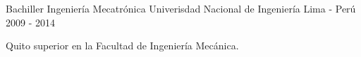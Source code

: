 

\begin{cventries}

  \cventry
    {Bachiller Ingenier\'ia Mecatr\'onica} %
    {Univerisdad Nacional de Ingenier\'ia} %
    {Lima - Per\'u} %
    {2009 - 2014} %
    {
      \begin{cvitems} %
        \item {Quito superior en la Facultad de Ingenier\'ia Mec\'anica.}
      \end{cvitems}
    }

\end{cventries}
